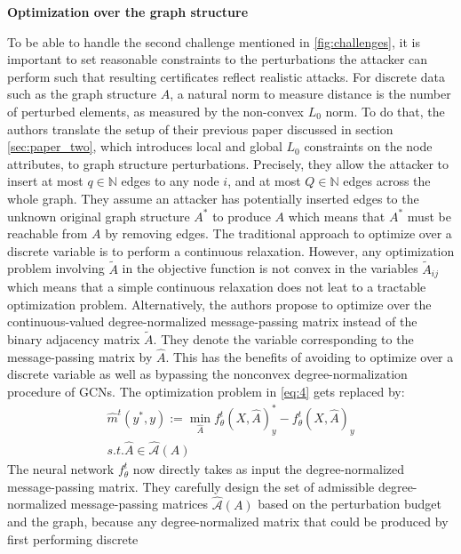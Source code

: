 \documentclass[a4paper,preprint]{sig-alternate}
\begin{document}
\textbf{Optimization over the graph structure}\newline

To be able to handle the second challenge mentioned in \ref{fig:challenges}, it is important to set reasonable constraints to 
the perturbations the attacker can perform such that resulting certificates reflect realistic attacks.
For discrete data such as the graph structure $A$, a natural norm to measure distance is the number of perturbed
elements, as measured by the non-convex $L_0$ norm. 
To do that, the authors translate the setup of their previous paper discussed in section \ref{sec:paper_two},
which introduces local and global $L_0$ constraints on the node attributes, to graph structure perturbations.
Precisely, they allow the attacker to insert at most $q \in \mathbb{N}$ edges to any node $i$, and at most $Q \in \mathbb{N}$ edges
across the whole graph.
They assume an attacker has potentially inserted edges to the unknown original graph structure $A^{\ast}$ to produce
$A$ which means that $A^{\ast}$ must be reachable from $A$ by removing edges.\newline
The traditional approach to optimize over a discrete variable is to perform a continuous relaxation. 
However, any optimization problem involving $\tilde{A}$ in the objective function is not convex in the variables $\tilde{A}_{ij}$ 
which means that a simple continuous relaxation does not leat to a tractable optimization problem. Alternatively, 
the authors propose to optimize over the continuous-valued degree-normalized message-passing matrix instead of the binary adjacency matrix $\tilde{A}$.
They denote the variable corresponding to the message-passing matrix by $\hat{A}$. This has the benefits of avoiding
to optimize over a discrete variable as well as bypassing the nonconvex degree-normalization procedure of GCNs.
The optimization problem in \ref{eq:4} gets replaced by:
\begin{gather}
\label{eq:5}
    \hat{m}^t (y^{\ast}, y) := \min_{\hat{A}} f_{\theta}^t (X, \hat{A})_y^{\ast}
    - f_{\theta}^t (X, \hat{A})_y \\
    s.t. \hat{A} \in \mathcal{\hat{A}}(A) \nonumber
\end{gather}
The neural network $f_{\theta}^t$ now directly takes as input the degree-normalized message-passing matrix.
They carefully design the set of admissible degree-normalized message-passing matrices $\mathcal{\hat{A}}(A)$ based
on the perturbation budget and the graph, because any degree-normalized matrix that could be produced by first performing discrete
\end{document}
